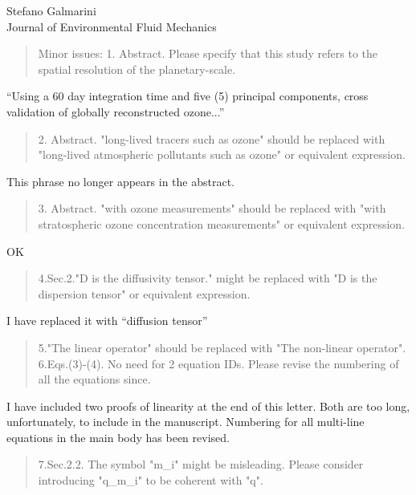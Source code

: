 \documentclass{letter}
\begin{document}
\begin{letter}{Stefano Galmarini\\
Journal of Environmental Fluid Mechanics}
\begin{quote}
Minor issues:
1. Abstract. Please specify that this study refers to the spatial resolution of the planetary-scale.
\end{quote}
``Using a 60 day integration time and five (5) principal components, cross
validation of globally reconstructed ozone...''
\begin{quote}
2. Abstract.  "long-lived tracers such as ozone" should be replaced with "long-lived atmospheric pollutants such as ozone" or equivalent expression.
\end{quote}
This phrase no longer appears in the abstract.
\begin{quote}
3. Abstract. "with ozone measurements" should be replaced with "with stratospheric ozone concentration measurements" or equivalent expression.
\end{quote}
OK
\begin{quote}
4.Sec.2."D is the diffusivity tensor." might be replaced with "D is the dispersion tensor" or equivalent expression.
\end{quote}
I have replaced it with ``diffusion tensor''
\begin{quote}
5."The linear operator" should be replaced with "The non-linear operator".
6.Eqs.(3)-(4). No need for 2 equation IDs. Please revise the numbering of all the equations since.
\end{quote}
I have included two proofs of linearity at the end of this letter. Both are too long, unfortunately, to include in the manuscript. Numbering for all multi-line equations in
the main body has been revised.
\begin{quote}
7.Sec.2.2. The symbol "m\_i" might be misleading. Please consider introducing "q\_m\_i" to be coherent with "q".
\end{quote}


\end{letter}
\end{document}
